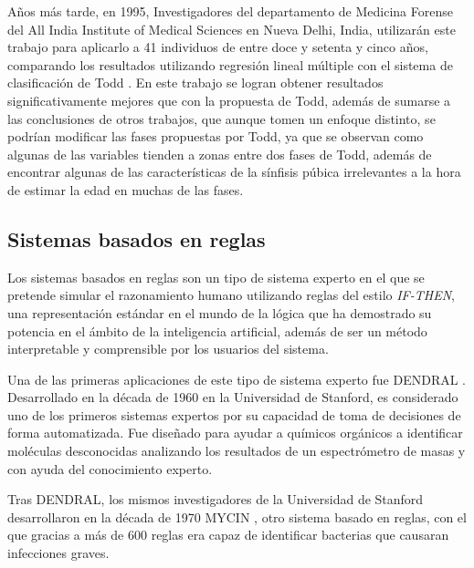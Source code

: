 Años más tarde, en 1995, Investigadores del departamento de Medicina Forense del All India Institute of Medical Sciences en Nueva Delhi, India, utilizarán este trabajo para aplicarlo a 41 individuos de entre doce y setenta y cinco años, comparando los resultados utilizando regresión lineal múltiple con el sistema de clasificación de Todd \cite{estudioComparandoGilbertTodd}. En este trabajo se logran obtener resultados significativamente mejores que con la propuesta de Todd, además de sumarse a las conclusiones de otros trabajos, que aunque tomen un enfoque distinto, se podrían modificar las fases propuestas por Todd, ya que se observan como algunas de las variables tienden a zonas entre dos fases de Todd, además de encontrar algunas de las características de la sínfisis púbica irrelevantes a la hora de estimar la edad en muchas de las fases.



\subsection{Sistemas basados en reglas}

Los sistemas basados en reglas son un tipo de sistema experto en el que se pretende simular el razonamiento humano utilizando reglas del estilo \textit{IF-THEN}, una representación estándar en el mundo de la lógica que ha demostrado su potencia en el ámbito de la inteligencia artificial, además de ser un método interpretable y comprensible por los usuarios del sistema.

Una de las primeras aplicaciones de este tipo de sistema experto fue DENDRAL \cite{primerDENDRAL}. Desarrollado en la década de 1960 en la Universidad de Stanford, es considerado uno de los primeros sistemas expertos por su capacidad de toma de decisiones de forma automatizada. Fue diseñado para ayudar a químicos orgánicos a identificar moléculas desconocidas analizando los resultados de un espectrómetro de masas y con ayuda del conocimiento experto.

Tras DENDRAL, los mismos investigadores de la Universidad de Stanford desarrollaron en la década de 1970 MYCIN \cite{tesisMYCIN}, otro sistema basado en reglas, con el que gracias a más de 600 reglas era capaz de identificar bacterias que causaran infecciones graves.

